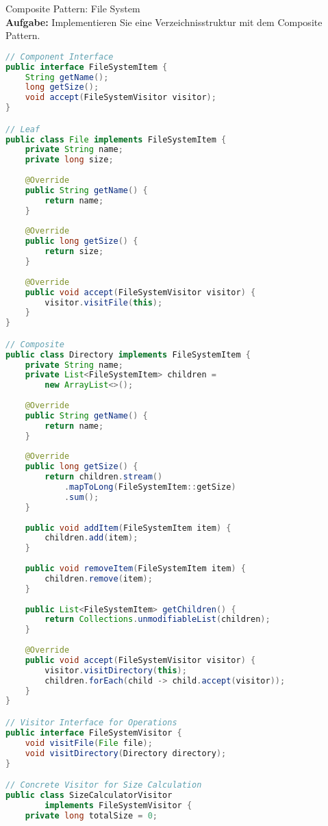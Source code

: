\begin{example2}[breakable]{Composite Pattern: File System}\\
\textbf{Aufgabe:} Implementieren Sie eine Verzeichnisstruktur mit dem Composite Pattern.

\begin{lstlisting}[language=Java, style=basesmol]
// Component Interface
public interface FileSystemItem {
    String getName();
    long getSize();
    void accept(FileSystemVisitor visitor);
}

// Leaf
public class File implements FileSystemItem {
    private String name;
    private long size;
    
    @Override
    public String getName() {
        return name;
    }
    
    @Override
    public long getSize() {
        return size;
    }
    
    @Override
    public void accept(FileSystemVisitor visitor) {
        visitor.visitFile(this);
    }
}

// Composite
public class Directory implements FileSystemItem {
    private String name;
    private List<FileSystemItem> children = 
        new ArrayList<>();
        
    @Override
    public String getName() {
        return name;
    }
    
    @Override
    public long getSize() {
        return children.stream()
            .mapToLong(FileSystemItem::getSize)
            .sum();
    }
    
    public void addItem(FileSystemItem item) {
        children.add(item);
    }
    
    public void removeItem(FileSystemItem item) {
        children.remove(item);
    }
    
    public List<FileSystemItem> getChildren() {
        return Collections.unmodifiableList(children);
    }
    
    @Override
    public void accept(FileSystemVisitor visitor) {
        visitor.visitDirectory(this);
        children.forEach(child -> child.accept(visitor));
    }
}

// Visitor Interface for Operations
public interface FileSystemVisitor {
    void visitFile(File file);
    void visitDirectory(Directory directory);
}

// Concrete Visitor for Size Calculation
public class SizeCalculatorVisitor 
        implements FileSystemVisitor {
    private long totalSize = 0;
    

\end{lstlisting}
\end{example2}
